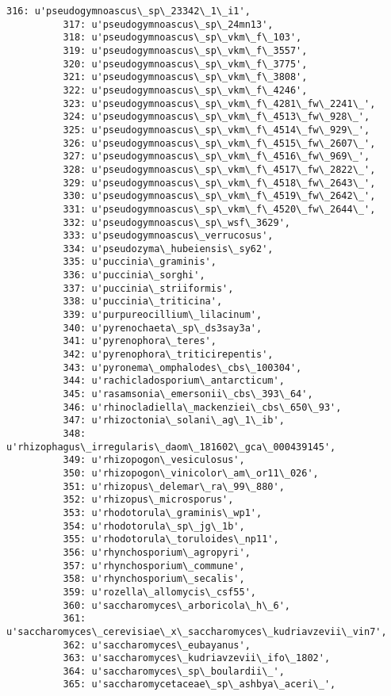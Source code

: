 \documentclass[11pt]{article}
\begin{document}
\begin{Verbatim}[commandchars=\\\{\}]
          316: u'pseudogymnoascus\_sp\_23342\_1\_i1',
          317: u'pseudogymnoascus\_sp\_24mn13',
          318: u'pseudogymnoascus\_sp\_vkm\_f\_103',
          319: u'pseudogymnoascus\_sp\_vkm\_f\_3557',
          320: u'pseudogymnoascus\_sp\_vkm\_f\_3775',
          321: u'pseudogymnoascus\_sp\_vkm\_f\_3808',
          322: u'pseudogymnoascus\_sp\_vkm\_f\_4246',
          323: u'pseudogymnoascus\_sp\_vkm\_f\_4281\_fw\_2241\_',
          324: u'pseudogymnoascus\_sp\_vkm\_f\_4513\_fw\_928\_',
          325: u'pseudogymnoascus\_sp\_vkm\_f\_4514\_fw\_929\_',
          326: u'pseudogymnoascus\_sp\_vkm\_f\_4515\_fw\_2607\_',
          327: u'pseudogymnoascus\_sp\_vkm\_f\_4516\_fw\_969\_',
          328: u'pseudogymnoascus\_sp\_vkm\_f\_4517\_fw\_2822\_',
          329: u'pseudogymnoascus\_sp\_vkm\_f\_4518\_fw\_2643\_',
          330: u'pseudogymnoascus\_sp\_vkm\_f\_4519\_fw\_2642\_',
          331: u'pseudogymnoascus\_sp\_vkm\_f\_4520\_fw\_2644\_',
          332: u'pseudogymnoascus\_sp\_wsf\_3629',
          333: u'pseudogymnoascus\_verrucosus',
          334: u'pseudozyma\_hubeiensis\_sy62',
          335: u'puccinia\_graminis',
          336: u'puccinia\_sorghi',
          337: u'puccinia\_striiformis',
          338: u'puccinia\_triticina',
          339: u'purpureocillium\_lilacinum',
          340: u'pyrenochaeta\_sp\_ds3say3a',
          341: u'pyrenophora\_teres',
          342: u'pyrenophora\_triticirepentis',
          343: u'pyronema\_omphalodes\_cbs\_100304',
          344: u'rachicladosporium\_antarcticum',
          345: u'rasamsonia\_emersonii\_cbs\_393\_64',
          346: u'rhinocladiella\_mackenziei\_cbs\_650\_93',
          347: u'rhizoctonia\_solani\_ag\_1\_ib',
          348: u'rhizophagus\_irregularis\_daom\_181602\_gca\_000439145',
          349: u'rhizopogon\_vesiculosus',
          350: u'rhizopogon\_vinicolor\_am\_or11\_026',
          351: u'rhizopus\_delemar\_ra\_99\_880',
          352: u'rhizopus\_microsporus',
          353: u'rhodotorula\_graminis\_wp1',
          354: u'rhodotorula\_sp\_jg\_1b',
          355: u'rhodotorula\_toruloides\_np11',
          356: u'rhynchosporium\_agropyri',
          357: u'rhynchosporium\_commune',
          358: u'rhynchosporium\_secalis',
          359: u'rozella\_allomycis\_csf55',
          360: u'saccharomyces\_arboricola\_h\_6',
          361: u'saccharomyces\_cerevisiae\_x\_saccharomyces\_kudriavzevii\_vin7',
          362: u'saccharomyces\_eubayanus',
          363: u'saccharomyces\_kudriavzevii\_ifo\_1802',
          364: u'saccharomyces\_sp\_boulardii\_',
          365: u'saccharomycetaceae\_sp\_ashbya\_aceri\_',

\end{Verbatim}
\end{document}
